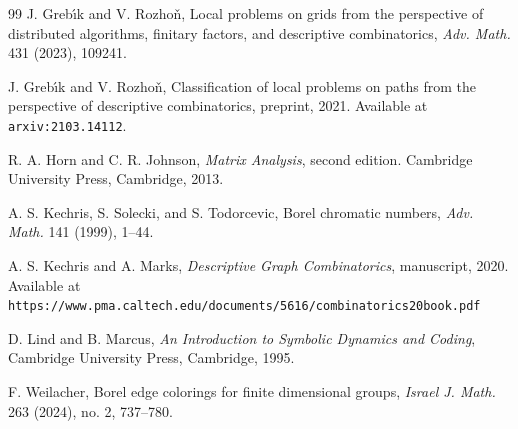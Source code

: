 \documentclass[11pt]{amsart}
\theoremstyle{definition}
\begin{document}
\begin{thebibliography}{99}
J. Greb\'{\i}k and V. Rozho\v{n}, Local problems on grids from the perspective of distributed algorithms, finitary factors, and descriptive combinatorics, \textit{Adv. Math.} 431 (2023), 109241.

J. Greb\'{\i}k and V. Rozho\v{n}, Classification of local problems on paths from the perspective of descriptive combinatorics, preprint, 2021. Available at {\tt arxiv:2103.14112}.

R. A. Horn and C. R. Johnson, \textit{Matrix Analysis}, second edition. Cambridge University Press, Cambridge, 2013.

A. S. Kechris, S. Solecki, and S. Todorcevic, Borel chromatic numbers, \textit{Adv. Math.} 141 (1999), 1--44.

A. S. Kechris and A. Marks, \textit{Descriptive Graph Combinatorics}, manuscript, 2020. Available at \\ {\tt https://www.pma.caltech.edu/documents/5616/combinatorics20book.pdf}

D. Lind and B. Marcus, \textit{An Introduction to Symbolic Dynamics and Coding}, Cambridge University Press, Cambridge, 1995.

F. Weilacher, Borel edge colorings for finite dimensional groups, \textit{Israel J. Math.} 263 (2024), no. 2, 737--780.
\end{thebibliography}
\end{document}
